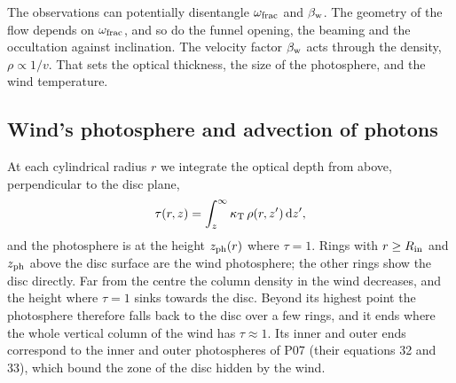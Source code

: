 The observations can potentially disentangle $\omega_{\rm frac}$ and $\beta_{\rm w}$.
The geometry of the flow depends on $\omega_{\rm frac}$, and so do the funnel opening, the beaming and the occultation against inclination.
The velocity factor $\beta_{\rm w}$ acts through the density, $\rho \propto 1/v$.
That sets the optical thickness, the size of the photosphere, and the wind temperature.

\subsection{Wind's photosphere and advection of photons}
\label{sec:wind:photosphere}

At each cylindrical radius $r$ we integrate the optical depth from above, perpendicular to the disc plane,
\begin{equation}
\tau(r, z) = \int_z^\infty \kappa_{\rm T}\,\rho(r, z')\,{\rm d}z',
\label{eq:tau}
\end{equation}
and the photosphere is at the height $z_{\rm ph}(r)$ where $\tau = 1$.
Rings with $r \ge R_{\rm in}$ and $z_{\rm ph}$ above the disc surface are the wind photosphere; the other rings show the disc directly.
{Far from the centre the column density in the wind decreases, and the height where $\tau = 1$ sinks towards the disc.
Beyond its highest point the photosphere therefore falls back to the disc over a few rings}{, and it ends where the whole vertical column of the wind has $\tau \approx 1$.
Its inner and outer ends correspond to the inner and outer photospheres of P07 (their equations 32 and 33), which bound the zone of the disc hidden by the wind.}
